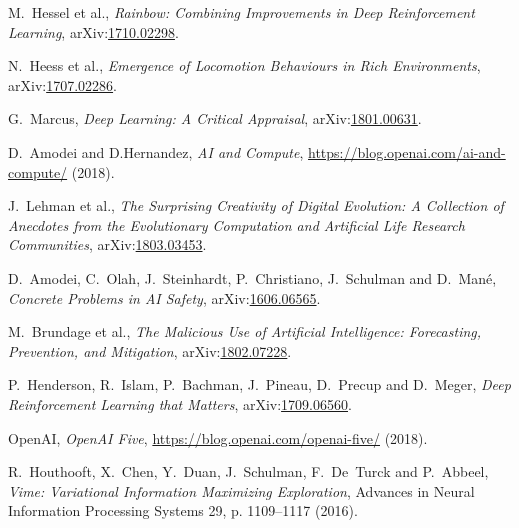 \documentclass[11pt, a4paper]{report} %
\begin{document}
\begin{thebibliography}{99}
M.~Hessel et al., \textit{Rainbow: Combining Improvements in Deep Reinforcement Learning}, arXiv:\href{https://arxiv.org/abs/1710.02298}{1710.02298}.



N.~Heess et al., \textit{Emergence of Locomotion Behaviours in Rich Environments}, arXiv:\href{https://arxiv.org/abs/1707.02286}{1707.02286}.



G.~Marcus, \textit{Deep Learning: A Critical Appraisal}, arXiv:\href{https://arxiv.org/abs/1801.00631}{1801.00631}. 




D.~Amodei and D.Hernandez, \textit{AI and Compute}, \href{https://blog.openai.com/ai-and-compute/}{https://blog.openai.com/ai-and-compute/} (2018).


J.~Lehman et al., \textit{The Surprising Creativity of Digital Evolution: A Collection of Anecdotes from the Evolutionary Computation and Artificial Life Research Communities}, arXiv:\href{https://arxiv.org/abs/1803.03453}{1803.03453}. 




D.~Amodei, C.~Olah, J.~Steinhardt, P.~Christiano, J.~Schulman and D.~Mané, \textit{Concrete Problems in AI Safety}, arXiv:\href{https://arxiv.org/abs/1606.06565}{1606.06565}. 




M.~Brundage et al., \textit{The Malicious Use of Artificial Intelligence: Forecasting, Prevention, and Mitigation}, arXiv:\href{https://arxiv.org/abs/1802.07228}{1802.07228}. 




P.~Henderson, R.~Islam, P.~Bachman, J.~Pineau, D.~Precup and D.~Meger, \textit{Deep Reinforcement Learning that Matters}, arXiv:\href{https://arxiv.org/abs/1709.06560}{1709.06560}. 

OpenAI, \textit{OpenAI Five}, \href{https://blog.openai.com/openai-five/}{https://blog.openai.com/openai-five/} (2018).



R.~Houthooft, X.~Chen, Y.~Duan, J.~Schulman, F.~De~Turck and P.~Abbeel, \emph{Vime: Variational Information Maximizing Exploration}, Advances in Neural Information Processing Systems 29, p. 1109--1117 (2016).






\end{thebibliography}
\end{document}
